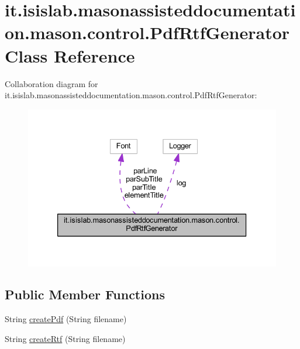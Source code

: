 \hypertarget{classit_1_1isislab_1_1masonassisteddocumentation_1_1mason_1_1control_1_1_pdf_rtf_generator}{\section{it.\-isislab.\-masonassisteddocumentation.\-mason.\-control.\-Pdf\-Rtf\-Generator Class Reference}
\label{classit_1_1isislab_1_1masonassisteddocumentation_1_1mason_1_1control_1_1_pdf_rtf_generator}
}


Collaboration diagram for it.\-isislab.\-masonassisteddocumentation.\-mason.\-control.\-Pdf\-Rtf\-Generator\-:\nopagebreak
\begin{figure}[H]
\begin{center}
\leavevmode
\includegraphics[width=333pt]{classit_1_1isislab_1_1masonassisteddocumentation_1_1mason_1_1control_1_1_pdf_rtf_generator__coll__graph}
\end{center}
\end{figure}
\subsection*{Public Member Functions}
\begin{DoxyCompactItemize}
\item 
String \hyperlink{classit_1_1isislab_1_1masonassisteddocumentation_1_1mason_1_1control_1_1_pdf_rtf_generator_a9fce71372853c35cc50c62bbd75789eb}{create\-Pdf} (String filename)
\item 
String \hyperlink{classit_1_1isislab_1_1masonassisteddocumentation_1_1mason_1_1control_1_1_pdf_rtf_generator_ab87d8842aba028de4988efc8f9099ff5}{create\-Rtf} (String filename)
\end{DoxyCompactItemize}
